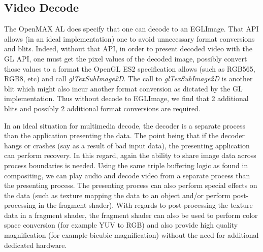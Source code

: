 \documentclass[a4paper,11pt]{article}
\begin{document}
\subsection{Video Decode}
\begin{indenter}{2cm}

The OpenMAX AL does specify that one can decode to an EGLImage. That API allows  (in an ideal implementation) one to avoid unnecessary format conversions and blits.  Indeed, without that API, in order to present decoded video with the GL API, one must get the pixel values of the decoded image, possibly convert those values to a format the OpenGL ES2 specification allows (such as RGB565, RGB8, etc) and call \textit{glTexSubImage2D}. The call to \textit{glTexSubImage2D} is another blit which might also incur another format conversion as dictated by the GL implementation. Thus without decode to EGLImage, we find that 2 additional blits and possibly 2 additional format conversions are required. 

In an ideal situation for multimedia decode, the decoder is a separate process than the application presenting the data. The point being that if the decoder hangs or crashes (say as a result of bad input data), the presenting application can perform recovery. In this regard, again the ability to share image data across process boundaries is needed. Using the same triple buffering logic as found in compositing, we can play audio and decode video from a separate process than the presenting process. The presenting process can also perform special effects on the data (such as texture mapping the data to an object and/or perform post-processing in the fragment shader). With regards to post-processing the texture data in a fragment shader, the fragment shader can also be used to perform color space conversion (for example YUV to RGB) and also provide high quality magnification (for example bicubic magnification) without the need for additional dedicated hardware.

\end{indenter}
\end{document}
